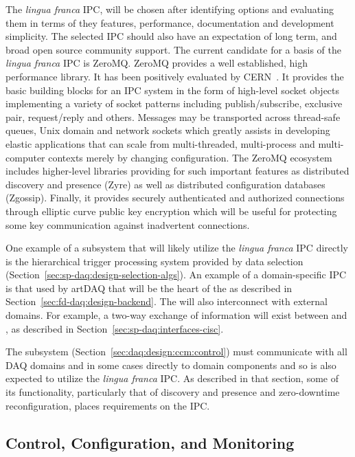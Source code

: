 The \textit{lingua franca} IPC, will be chosen after identifying options and evaluating them in terms of they features, performance, documentation and development simplicity. 
The selected IPC should also have an expectation of long term, and broad open source community support. 
The current candidate for a basis of the \textit{lingua franca} IPC is ZeroMQ. 
ZeroMQ provides a well established, high performance library. 
It has been positively evaluated by CERN~\cite{cern-zeromq}. 
It provides the basic building blocks for an IPC system in the form of high-level socket objects implementing a variety of socket patterns including publish/subscribe, exclusive pair, request/reply and others. 
Messages may be transported across thread-safe queues, Unix domain and network sockets which greatly assists in developing elastic applications that can scale from multi-threaded, multi-process and multi-computer contexts merely by changing configuration. 
The ZeroMQ ecosystem includes higher-level libraries providing for such important features as distributed discovery and presence (Zyre) as well as distributed configuration databases (Zgossip). 
Finally, it provides securely authenticated and authorized connections through elliptic curve public key encryption which will be useful for protecting some key communication against inadvertent connections.

One example of a subsystem that will likely utilize the \textit{lingua franca} IPC directly is the hierarchical trigger processing system provided by data selection (Section~\ref{sec:sp-daq:design-selection-algs}).
An example of a domain-specific IPC is that used by artDAQ that will be the heart of the  as described in Section~\ref{sec:fd-daq:design-backend}.
The  will also interconnect with external domains. 
For example, a two-way exchange of information will exist between  and , as described in Section~\ref{sec:sp-daq:interfaces-cisc}.  

The  subsystem (Section~\ref{sec:daq:design:ccm:control}) must communicate with all DAQ domains and in some cases directly to domain components and so is also expected to utilize the \textit{lingua franca} IPC. 
As described in that section, some of its functionality, particularly that of discovery and presence and zero-downtime reconfiguration, places requirements on the IPC.



\subsection{Control, Configuration, and Monitoring}
\label{sec:fd-daq:design-run-control}

